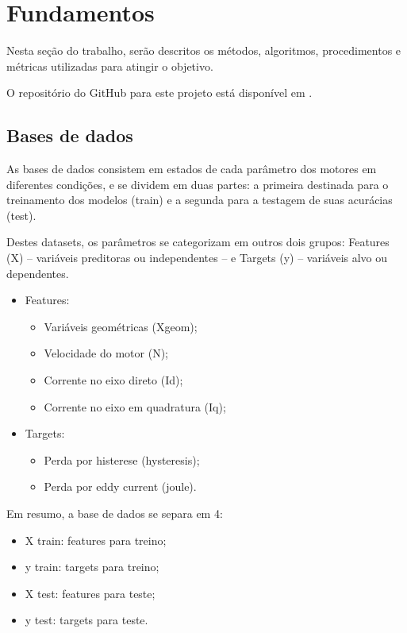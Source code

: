\documentclass{article}
\begin{document}
\section{Fundamentos}


Nesta seção do trabalho, serão descritos os métodos, algoritmos, procedimentos e métricas utilizadas para atingir o objetivo.

O repositório do GitHub para este projeto está disponível em \parencite{barretoleme2025icmotores}.

\subsection{Bases de dados}

As bases de dados consistem em estados de cada parâmetro dos motores em diferentes condições, e se dividem em duas partes: a primeira destinada para o treinamento dos modelos (train) e a segunda para a testagem de suas acurácias (test).

Destes datasets, os parâmetros se categorizam em outros dois grupos: Features (X) \--- variáveis preditoras ou independentes \--- e Targets (y) \--- variáveis alvo ou dependentes.

\begin{itemize}
    \item Features:
    \begin{itemize}
        \item Variáveis geométricas (Xgeom);
        \item Velocidade do motor (N);
        \item Corrente no eixo direto (Id);
        \item Corrente no eixo em quadratura (Iq);
    \end{itemize}
    \item Targets:
    \begin{itemize}
        \item Perda por histerese (hysteresis);
        \item Perda por eddy current (joule).    
    \end{itemize}
\end{itemize}

\noindent Em resumo, a base de dados se separa em 4:

\begin{itemize}
    \item X train: features para treino;
    \item y train: targets para treino;
    \item X test: features para teste;
    \item y test: targets para teste.
\end{itemize}
\end{document}
